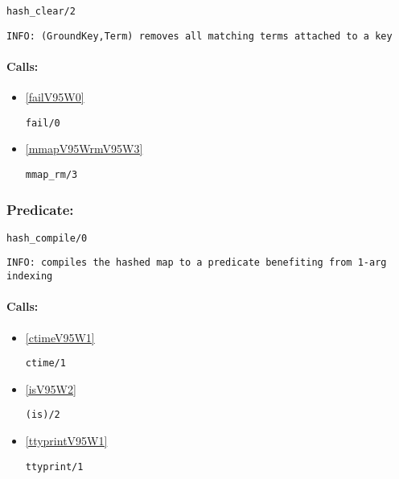 \begin{verbatim}
hash_clear/2
\end{verbatim}

{\small \begin{verbatim}
INFO: (GroundKey,Term) removes all matching terms attached to a key

\end{verbatim}}
\paragraph{Calls:} 
\begin{itemize}
\item \ref{failV95W0} 
\begin{verbatim}
fail/0
\end{verbatim}

\item \ref{mmapV95WrmV95W3} 
\begin{verbatim}
mmap_rm/3
\end{verbatim}

\end{itemize}

\subsubsection{Predicate:} \label{hashV95WcompileV95W0}

\begin{verbatim}
hash_compile/0
\end{verbatim}

{\small \begin{verbatim}
INFO: compiles the hashed map to a predicate benefiting from 1-arg indexing

\end{verbatim}}
\paragraph{Calls:} 
\begin{itemize}
\item \ref{ctimeV95W1} 
\begin{verbatim}
ctime/1
\end{verbatim}

\item \ref{isV95W2} 
\begin{verbatim}
(is)/2
\end{verbatim}

\item \ref{ttyprintV95W1} 
\begin{verbatim}
ttyprint/1
\end{verbatim}

\end{itemize}

